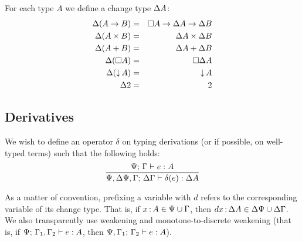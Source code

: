 \documentclass{article}
\begin{document}
For each type $A$ we define a change type $\Delta A$:
\begin{eqnarray*}
  \Delta(A \to B) &=& \square{A} \to \Delta A \to \Delta B\\
  \Delta(A \times B) &=& \Delta A \times \Delta B\\
  \Delta(A + B) &=& \Delta A + \Delta B\\
  \Delta(\square{A}) &=& \square{\Delta A}\\
  \Delta({\downarrow}\,{A}) &=& {\downarrow}\,{A}\\
  \Delta 2 &=& 2
\end{eqnarray*}



\subsection{Derivatives}

We wish to define an operator $\delta$ on typing derivations (or if possible, on
well-typed terms) such that the following holds:
\[\infer{\J{\GP,\GD\GP,\GG}{\GD\GG}{\delta(e)}{\Delta A}}
        {\J{\GP}{\GG}{e}{A}}
\]

As a matter of convention, prefixing a variable with $d$ refers to the
corresponding variable of its change type. That is, if $x \,{:}\, A \in \Psi \cup
\Gamma$, then $dx \,{:}\, \Delta A \in \Delta\Psi \cup \Delta\Gamma$. We also transparently use
weakening and monotone-to-discrete weakening (that is, if
${\Psi};\,{\Gamma_1,\Gamma_2}\vdash {e}:{A}$, then ${\Psi,\Gamma_1};\,{\Gamma_2}\vdash {e}:{A}$).
\end{document}

